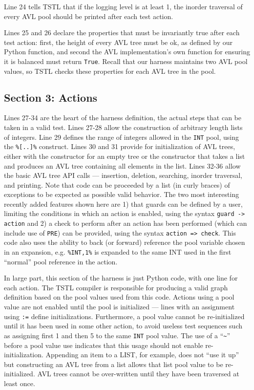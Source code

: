 \documentclass{sig-alternate}
\begin{document}
Line 24 tells TSTL that if the logging level is at least 1, the
inorder traversal of every AVL pool should be printed after each test
action.

Lines 25 and 26 declare the properties that must be invariantly true
after each test action: first, the height of every AVL tree must be
ok, as defined by our Python function, and second the AVL
implementation's own function for ensuring it is balanced must return
{\tt True}.  Recall that our harness maintains two AVL pool values, so
TSTL checks these properties for each AVL tree in the pool.

\subsection{Section 3: Actions}
\label{sec:actions}

Lines 27-34 are the heart of the harness definition, the actual steps
that can be taken in a valid test.  Lines 27-28 allow the construction
of arbitrary length lists of integers.  Line 29 defines the range of
integers allowed in the {\tt INT} pool, using the {\tt \%[..]\%}
construct.  Lines 30 and 31 provide for initialization of AVL trees,
either with the constructor for an empty tree or the constructor that
takes a list and produces an AVL tree containing all elements in the
list.  Lines 32-36 allow the basic AVL tree API calls --- insertion,
deletion, searching, inorder traversal, and printing.  Note that code can be
proceeded by a list (in curly braces) of exceptions to be expected as possible valid
behavior.  The two most interesting recently added features shown here are 1) that
guards can be defined by a user, limiting the conditions in which an
action is enabled, using the syntax {\tt guard -> action} and 2) a check
to perform after an action has been performed (which can include use
of {\tt PRE}) can be provided, using the syntax {\tt action =>
  check}.  This code also uses the ability to back (or forward)
reference the pool variable chosen in an expansion, e.g. {\tt \%INT,1\%}
is expanded to the same INT used in the first ``normal'' pool
reference in the action.

In large part, this section of the harness is just Python
code, with one line for each action.  The TSTL compiler is responsible
for producing a valid graph definition based on the pool values used
from this code.  Actions using a pool value are not enabled until the
pool is initialized --- lines with an assignment using {\tt :=} define
initializations.  Furthermore, a pool value cannot be re-initialized
until it has been used in some other action, to avoid useless test
sequences such as assigning first 1 and then 5 to the same {\tt INT}
pool value.  The use of a ``\verb|~|'' before a pool value use indicates that
this usage should not enable re-initialization.  Appending an item to
a LIST, for example, does not ``use it up'' but constructing an AVL
tree from a list allows that list pool value to be re-initialized.  AVL
trees cannot be over-written until they have been traversed at least
once.
\end{document}
